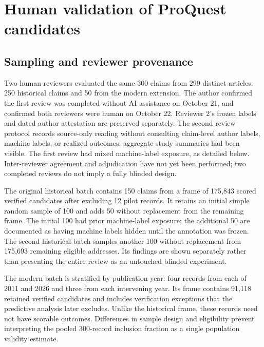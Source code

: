\section{Human validation of ProQuest candidates}
\subsection{Sampling and reviewer provenance}
Two human reviewers evaluated the same 300 claims from 299 distinct articles: 250 historical claims and 50 from the modern extension. The author confirmed the first review was completed without AI assistance on October 21, and confirmed both reviewers were human on October 22. Reviewer 2's frozen labels and dated author attestation are preserved separately. The second review protocol records source-only reading without consulting claim-level author labels, machine labels, or realized outcomes; aggregate study summaries had been visible. The first review had mixed machine-label exposure, as detailed below. Inter-reviewer agreement and adjudication have not yet been performed; two completed reviews do not imply a fully blinded design.

The original historical batch contains 150 claims from a frame of 175,843 scored verified candidates after excluding 12 pilot records. It retains an initial simple random sample of 100 and adds 50 without replacement from the remaining frame. The initial 100 had prior machine-label exposure; the additional 50 are documented as having machine labels hidden until the annotation was frozen. The second historical batch samples another 100 without replacement from 175,693 remaining eligible addresses. Its findings are shown separately rather than presenting the entire review as an untouched blinded experiment.

The modern batch is stratified by publication year: four records from each of 2011 and 2026 and three from each intervening year. Its frame contains 91,118 retained verified candidates and includes verification exceptions that the predictive analysis later excludes. Unlike the historical frame, these records need not have scorable outcomes. Differences in sample design and eligibility prevent interpreting the pooled 300-record inclusion fraction as a single population validity estimate.


